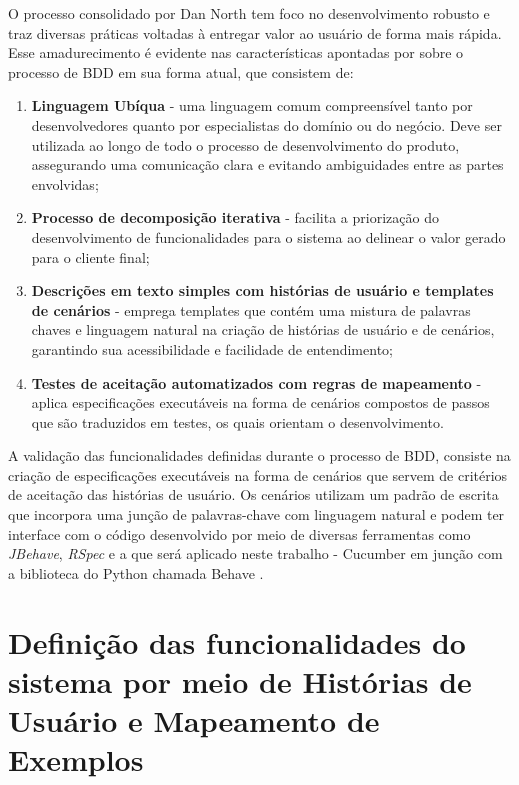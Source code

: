 O processo consolidado por Dan North tem foco no desenvolvimento robusto e traz diversas práticas voltadas à entregar valor ao usuário de forma mais rápida. Esse 
amadurecimento é evidente nas características apontadas por  sobre o processo de BDD em sua forma atual, que consistem de:

\begin{enumerate}
	\item \textbf{Linguagem Ubíqua} - uma linguagem comum compreensível tanto por desenvolvedores quanto por especialistas do domínio ou do negócio. Deve ser utilizada 
	ao longo de todo o processo de desenvolvimento do produto, assegurando uma comunicação clara e evitando ambiguidades entre as partes envolvidas;
	\item \textbf{Processo de decomposição iterativa} - facilita a priorização do desenvolvimento de funcionalidades para o sistema ao delinear o valor gerado para o cliente final;
	\item \textbf{Descrições em texto simples com histórias de usuário e templates de cenários} - emprega templates que contém uma mistura de palavras chaves e linguagem natural na 
	criação de histórias de usuário e de cenários, garantindo sua acessibilidade e facilidade de entendimento;
	\item \textbf{Testes de aceitação automatizados com regras de mapeamento} - aplica especificações executáveis na forma de cenários compostos de passos que são traduzidos em testes, 
	os quais orientam o desenvolvimento.
\end{enumerate}

A validação das funcionalidades definidas durante o processo de BDD, consiste na criação de especificações executáveis na forma de cenários que servem de critérios de aceitação das 
histórias de usuário. Os cenários utilizam um padrão de escrita que incorpora uma junção de palavras-chave com linguagem natural e podem ter interface com o código desenvolvido por 
meio de diversas ferramentas como \textit{JBehave}, \textit{RSpec} \cite{cucumberHistory} e a que será aplicado neste trabalho - Cucumber \cite{cucumberDocs} em junção com a biblioteca 
do Python chamada Behave \cite{behaveDocs}.


\section{\textbf{Definição das funcionalidades do sistema por meio de Histórias de Usuário e Mapeamento de Exemplos}}

